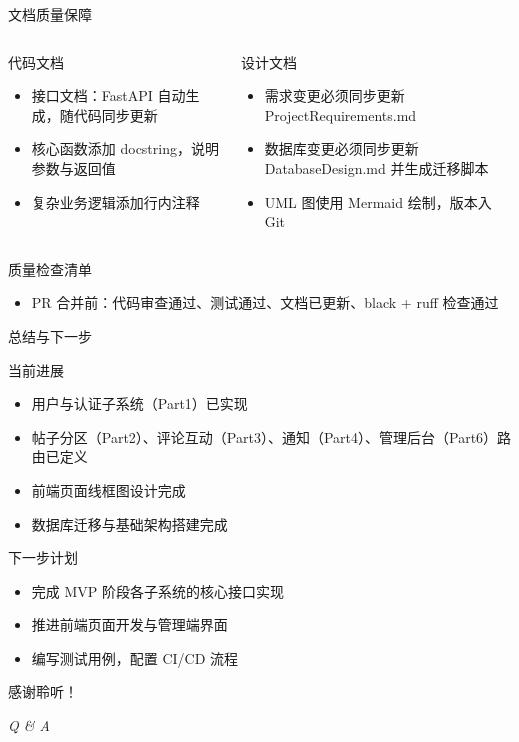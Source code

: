 \documentclass[aspectratio=169,UTF8]{ctexbeamer}
\begin{document}
\begin{frame}{文档质量保障}
    \begin{columns}
        \begin{block}{代码文档}
            \begin{itemize}
                \item 接口文档：FastAPI 自动生成，随代码同步更新
                \item 核心函数添加 docstring，说明参数与返回值
                \item 复杂业务逻辑添加行内注释
            \end{itemize}
        \end{block}
        \begin{block}{设计文档}
            \begin{itemize}
                \item 需求变更必须同步更新 ProjectRequirements.md
                \item 数据库变更必须同步更新 DatabaseDesign.md 并生成迁移脚本
                \item UML 图使用 Mermaid 绘制，版本入 Git
            \end{itemize}
        \end{block}
    \end{columns}
    \vspace{0.3cm}
    \begin{block}{质量检查清单}
        \begin{itemize}
            \item PR 合并前：代码审查通过、测试通过、文档已更新、black + ruff 检查通过
        \end{itemize}
    \end{block}
\end{frame}

\begin{frame}{总结与下一步}
    \begin{block}{当前进展}
        \begin{itemize}
            \item 用户与认证子系统（Part1）已实现
            \item 帖子分区（Part2）、评论互动（Part3）、通知（Part4）、管理后台（Part6）路由已定义
            \item 前端页面线框图设计完成
            \item 数据库迁移与基础架构搭建完成
        \end{itemize}
    \end{block}
    \pause
    \begin{block}{下一步计划}
        \begin{itemize}
            \item 完成 MVP 阶段各子系统的核心接口实现
            \item 推进前端页面开发与管理端界面
            \item 编写测试用例，配置 CI/CD 流程
        \end{itemize}
    \end{block}
\end{frame}

\begin{frame}
    \centering
    \Huge 感谢聆听！
    \vspace{1cm}

    \normalsize
    \textit{Q \& A}
\end{frame}
\end{document}
